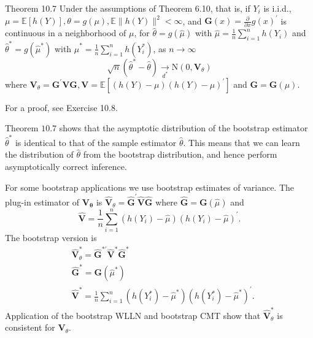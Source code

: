 \documentclass[10pt]{article}
\begin{document}
Theorem 10.7 Under the assumptions of Theorem 6.10, that is, if $Y_{i}$ is i.i.d., $\mu=\mathbb{E}[h(Y)], \theta=g(\mu), \mathbb{E}\|h(Y)\|^{2}<\infty$, and $\boldsymbol{G}(x)=\frac{\partial}{\partial x} g(x)^{\prime}$ is continuous in a neighborhood of $\mu$, for $\widehat{\theta}=g(\widehat{\mu})$ with $\widehat{\mu}=\frac{1}{n} \sum_{i=1}^{n} h\left(Y_{i}\right)$ and $\widehat{\theta}^{*}=g\left(\widehat{\mu}^{*}\right)$ with $\widehat{\mu}^{*}=\frac{1}{n} \sum_{i=1}^{n} h\left(Y_{i}^{*}\right)$, as $n \rightarrow \infty$
$$
\sqrt{n}\left(\widehat{\theta}^{*}-\widehat{\theta}\right) \underset{d^{*}}{\longrightarrow} \mathrm{N}\left(0, \boldsymbol{V}_{\theta}\right)
$$
where $\boldsymbol{V}_{\theta}=\boldsymbol{G}^{\prime} \boldsymbol{V} \boldsymbol{G}, \boldsymbol{V}=\mathbb{E}\left[(h(Y)-\mu)(h(Y)-\mu)^{\prime}\right]$ and $\boldsymbol{G}=\boldsymbol{G}(\mu)$.

For a proof, see Exercise 10.8.

Theorem $10.7$ shows that the asymptotic distribution of the bootstrap estimator $\widehat{\theta}^{*}$ is identical to that of the sample estimator $\widehat{\theta}$. This means that we can learn the distribution of $\widehat{\theta}$ from the bootstrap distribution, and hence perform asymptotically correct inference.

For some bootstrap applications we use bootstrap estimates of variance. The plug-in estimator of $\boldsymbol{V}_{\boldsymbol{\theta}}$ is $\widehat{\boldsymbol{V}}_{\theta}=\widehat{\boldsymbol{G}}^{\prime} \widehat{\boldsymbol{V}} \widehat{\boldsymbol{G}}$ where $\widehat{\boldsymbol{G}}=\boldsymbol{G}(\widehat{\mu})$ and
$$
\widehat{\boldsymbol{V}}=\frac{1}{n} \sum_{i=1}^{n}\left(h\left(Y_{i}\right)-\widehat{\mu}\right)\left(h\left(Y_{i}\right)-\widehat{\mu}\right)^{\prime} .
$$
The bootstrap version is
$$
\begin{aligned}
&\widehat{\boldsymbol{V}}_{\theta}^{*}=\widehat{\boldsymbol{G}}^{* \prime} \widehat{\boldsymbol{V}}^{*} \widehat{\boldsymbol{G}}^{*} \\
&\widehat{\boldsymbol{G}}^{*}=\boldsymbol{G}\left(\widehat{\mu}^{*}\right) \\
&\widehat{\boldsymbol{V}}^{*}=\frac{1}{n} \sum_{i=1}^{n}\left(h\left(Y_{i}^{*}\right)-\widehat{\mu}^{*}\right)\left(h\left(Y_{i}^{*}\right)-\widehat{\mu}^{*}\right)^{\prime} .
\end{aligned}
$$
Application of the bootstrap WLLN and bootstrap CMT show that $\widehat{\boldsymbol{V}}_{\theta}^{*}$ is consistent for $\boldsymbol{V}_{\theta}$.
\end{document}
